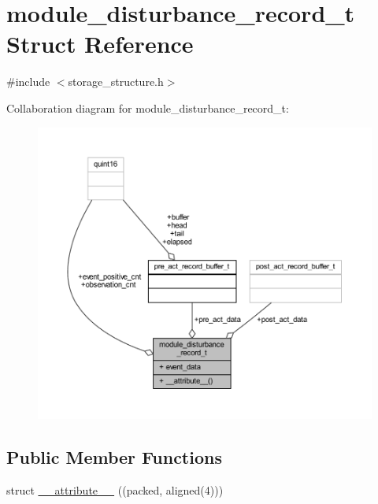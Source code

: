 \hypertarget{a00008}{\section{module\+\_\+disturbance\+\_\+record\+\_\+t Struct Reference}
\label{a00008}
}


{\ttfamily \#include $<$storage\+\_\+structure.\+h$>$}



Collaboration diagram for module\+\_\+disturbance\+\_\+record\+\_\+t\+:
\nopagebreak
\begin{figure}[H]
\begin{center}
\leavevmode
\includegraphics[width=350pt]{da/dd4/a00291}
\end{center}
\end{figure}
\subsection*{Public Member Functions}
\begin{DoxyCompactItemize}
\item 
struct \hyperlink{a00008_a46ac54b65ed07bd2f401d22dd3fbf99b}{\+\_\+\+\_\+attribute\+\_\+\+\_\+} ((packed, aligned(4)))
\end{DoxyCompactItemize}
